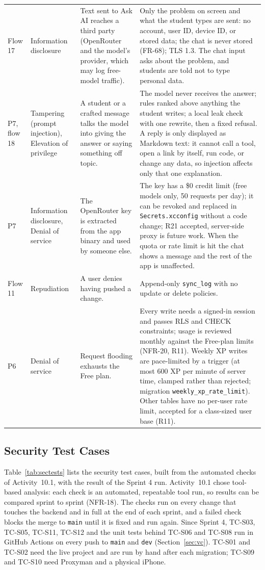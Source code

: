 \documentclass[12pt,letterpaper]{article}
\begin{document}
\begin{xltabular}{\textwidth}{@{}L{2.1cm} L{2.4cm} Y Y@{}}
Flow 17 & Information disclosure & Text sent to Ask AI reaches a third party (OpenRouter and the model's provider, which may log free-model traffic). & Only the problem on screen and what the student types are sent: no account, user ID, device ID, or stored data; the chat is never stored (FR-68); TLS 1.3. The chat input asks about the problem, and students are told not to type personal data. \\
P7, flow 18 & Tampering (prompt injection), Elevation of privilege & A student or a crafted message talks the model into giving the answer or saying something off topic. & The model never receives the answer; rules ranked above anything the student writes; a local leak check with one rewrite, then a fixed refusal. A reply is only displayed as Markdown text: it cannot call a tool, open a link by itself, run code, or change any data, so injection affects only that one explanation. \\
P7 & Information disclosure, Denial of service & The OpenRouter key is extracted from the app binary and used by someone else. & The key has a \$0 credit limit (free models only, 50 requests per day); it can be revoked and replaced in \texttt{Secrets.xcconfig} without a code change; R21 accepted, server-side proxy is future work. When the quota or rate limit is hit the chat shows a message and the rest of the app is unaffected. \\
Flow 11 & Repudiation & A user denies having pushed a change. & Append-only \texttt{sync\_log} with no update or delete policies. \\
P6 & Denial of service & Request flooding exhausts the Free plan. & Every write needs a signed-in session and passes RLS and CHECK constraints; usage is reviewed monthly against the Free-plan limits (NFR-20, R11). Weekly XP writes are pace-limited by a trigger (at most 600 XP per minute of server time, clamped rather than rejected; migration \texttt{weekly\_xp\_rate\_limit}). Other tables have no per-user rate limit, accepted for a class-sized user base (R11). \\
\end{xltabular}

\subsection{Security Test Cases}
Table~\ref{tab:sectests} lists the security test cases, built from the automated
checks of Activity~10.1, with the result of the Sprint 4 run. Activity~10.1 chose
tool-based analysis: each check is an automated, repeatable tool run, so results can
be compared sprint to sprint (NFR-18). The checks run on every change that touches
the backend and in full at the end of each sprint, and a failed check blocks the merge
to \texttt{main} until it is fixed and run again. Since Sprint 4, TC-S03, TC-S05,
TC-S11, TC-S12 and the unit tests behind TC-S06 and TC-S08 run in GitHub Actions on
every push to \texttt{main} and \texttt{dev} (Section~\ref{sec:vc}). TC-S01 and TC-S02
need the live project and are run by hand after each migration; TC-S09 and TC-S10
need Proxyman and a physical iPhone.
\end{document}
